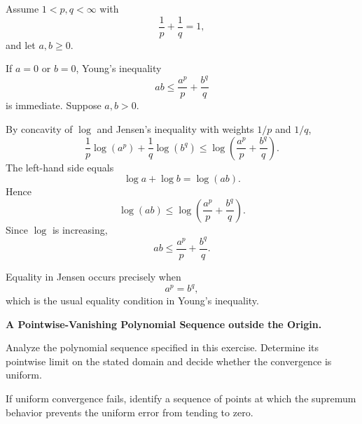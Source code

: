 \begin{solution}
Assume \(1<p,q<\infty\) with
\[
\frac1p+\frac1q=1,
\]
and let \(a,b\ge0\).

If \(a=0\) or \(b=0\), Young's inequality
\[
ab\le\frac{a^p}{p}+\frac{b^q}{q}
\]
is immediate. Suppose \(a,b>0\).

By concavity of \(\log\) and Jensen's inequality with weights \(1/p\) and \(1/q\),
\[
\frac1p\log(a^p)+\frac1q\log(b^q)
\le
\log\left(
\frac{a^p}{p}+\frac{b^q}{q}
\right).
\]
The left-hand side equals
\[
\log a+\log b=\log(ab).
\]
Hence
\[
\log(ab)
\le
\log\left(
\frac{a^p}{p}+\frac{b^q}{q}
\right).
\]
Since \(\log\) is increasing,
\[
\boxed{
ab\le\frac{a^p}{p}+\frac{b^q}{q}.
}
\]

Equality in Jensen occurs precisely when
\[
a^p=b^q,
\]
which is the usual equality condition in Young's inequality.
\end{solution}


\begin{problem}[CP-II-0031]
\label{prob:cp-ii-0031}
\textbf{A Pointwise-Vanishing Polynomial Sequence outside the Origin.}

\hspace*{1.5em}Analyze the polynomial sequence specified in this exercise. Determine its
pointwise limit on the stated domain and decide whether the convergence is
uniform.

If uniform convergence fails, identify a sequence of points at which the
supremum behavior prevents the uniform error from tending to zero.
\end{problem}


